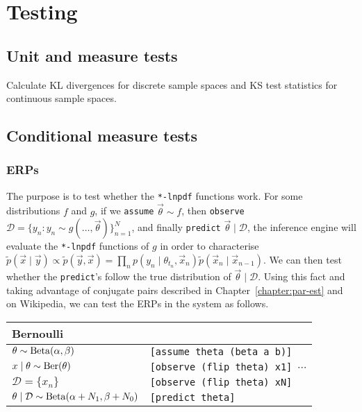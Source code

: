 \section{Testing}
\subsection{Unit and measure tests}
Calculate KL divergences for discrete sample spaces and KS test statistics for continuous sample spaces.
\subsection{Conditional measure tests}
\subsubsection{ERPs}
The purpose is to test whether the \verb!*-lnpdf! functions work. For some distributions $f$ and $g$, if we \verb!assume! $\vec\theta \sim f$, then \verb!observe! $\mathcal D = \{y_n : y_n \sim g(\dotsc, \vec \theta)\}_{n = 1}^N$, and finally \verb!predict! $\vec\theta \mid \mathcal D$, the inference engine will evaluate the \verb!*-lnpdf! functions of $g$ in order to characterise $\tilde p(\vec x \mid \vec y) \propto \tilde p(\vec y, \vec x) = \prod_n p(y_n \mid \theta_{t_n}, \vec x_n) \tilde p(\vec x_n \mid \vec x_{n - 1})$. We can then test whether the \verb!predict!'s follow the true distribution of $\vec\theta \mid \mathcal D$. Using this fact and taking advantage of conjugate pairs described in Chapter~\ref{chapter:par-est} and on Wikipedia, we can test the ERPs in the system as follows.

\begin{table}[ht!]
\begin{tabular}{ll}
\toprule
Bernoulli & \\
\midrule
$\theta \sim \operatorname{Beta}(\alpha, \beta)$								& \texttt{[assume theta (beta a b)]} \\
$x \mid \theta \sim \operatorname{Ber}(\theta)$								& \texttt{[observe (flip theta) x1] $\cdots$} \\
$\mathcal D = \{x_n\}$											& \texttt{[observe (flip theta) xN]} \\
$\theta \mid \mathcal D \sim \operatorname{Beta}(\alpha + N_1, \beta + N_0)$	& \texttt{[predict theta]} \\
\bottomrule
\end{tabular}
\end{table}

